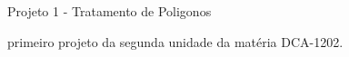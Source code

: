 Projeto 1 -\/ Tratamento de Poligonos

primeiro projeto da segunda unidade da matéria D\+C\+A-\/1202. 